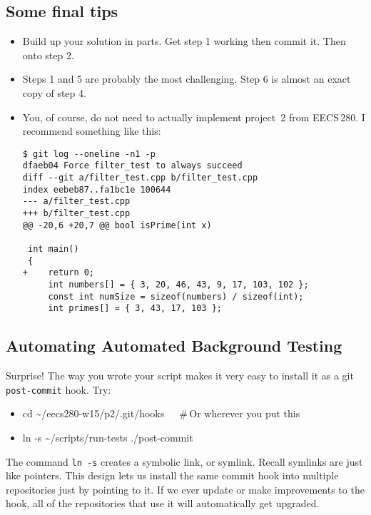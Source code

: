 \documentclass{article}
\begin{document}
\newpage

\subsection*{Some final tips}

\begin{itemize}
  \item Build up your solution in parts. Get step 1 working then commit it.
    Then onto step 2.
  \item Steps 1 and 5 are probably the most challenging. Step 6 is almost an
    exact copy of step 4.
  \item You, of course, do not need to actually implement project~2 from
    EECS\,280.  I recommend something like this:%
\lstset{basicstyle=\footnotesize\ttfamily}
\begin{lstlisting}
$ git log --oneline -n1 -p
dfaeb04 Force filter_test to always succeed
diff --git a/filter_test.cpp b/filter_test.cpp
index eebeb87..fa1bc1e 100644
--- a/filter_test.cpp
+++ b/filter_test.cpp
@@ -20,6 +20,7 @@ bool isPrime(int x)
 
 int main()
 {
+    return 0;
     int numbers[] = { 3, 20, 46, 43, 9, 17, 103, 102 };
     const int numSize = sizeof(numbers) / sizeof(int);
     int primes[] = { 3, 43, 17, 103 };
\end{lstlisting}
\end{itemize}

\subsection*{Automating Automated Background Testing}
Surprise! The way you wrote your script makes it very easy to install it as a git
\texttt{post-commit} hook. Try:

\begin{itemize}\tt
    \item cd \textasciitilde/eecs280-w15/p2/.git/hooks~~~\#\,Or wherever you put this
    \item ln -s \textasciitilde/scripts/run-tests ./post-commit
\end{itemize}

\noindent
The command \texttt{ln -s} creates a symbolic link, or symlink. Recall
symlinks are just like pointers. This design lets us install the same commit
hook into multiple repositories just by pointing to it. If we ever update or
make improvements to the hook, all of the repositories that use it will
automatically get upgraded.
\end{document}
